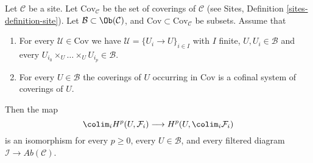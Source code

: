 \begin{lemma}
\label{lemma-colim-works-over-collection}
Let $\mathcal{C}$ be a site. Let $\text{Cov}_\mathcal{C}$ be the set
of coverings of $\mathcal{C}$ (see
Sites, Definition \ref{sites-definition-site}). Let
$\mathcal{B} \subset \Ob(\mathcal{C})$, and
$\text{Cov} \subset \text{Cov}_\mathcal{C}$
be subsets. Assume that
\begin{enumerate}
\item For every $\mathcal{U} \in \text{Cov}$ we have
$\mathcal{U} = \{U_i \to U\}_{i \in I}$ with $I$ finite,
$U, U_i \in \mathcal{B}$ and every
$U_{i_0} \times_U \ldots \times_U U_{i_p} \in \mathcal{B}$.
\item For every $U \in \mathcal{B}$ the coverings of $U$
occurring in $\text{Cov}$ is a cofinal system of coverings of $U$.
\end{enumerate}
Then the map
$$
\colim_i H^p(U, \mathcal{F}_i)
\longrightarrow
H^p(U, \colim_i \mathcal{F}_i)
$$
is an isomorphism for every $p \geq 0$, every $U \in \mathcal{B}$, and
every filtered diagram $\mathcal{I} \to \textit{Ab}(\mathcal{C})$.
\end{lemma}

